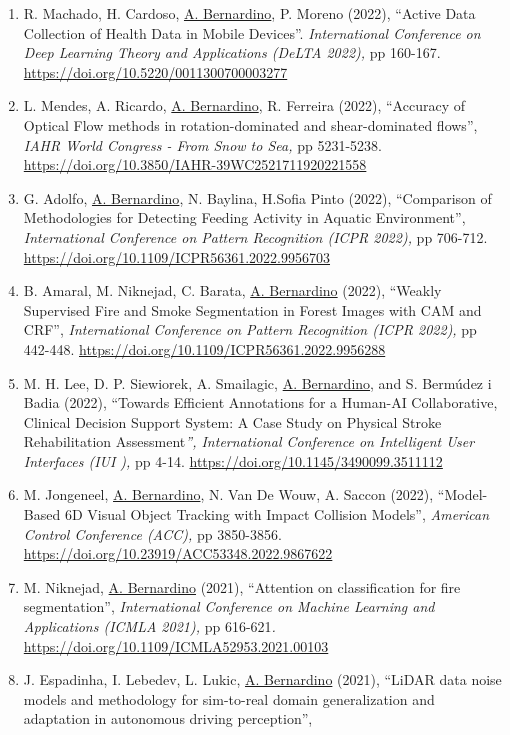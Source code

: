 \begin{enumerate}
\item
  R. Machado, H. Cardoso, \ul{A. Bernardino}, P. Moreno (2022), ``Active
  Data Collection of Health Data in Mobile Devices''.
  \emph{International Conference on Deep Learning Theory and
  Applications (DeLTA 2022),} pp 160-167.
  \url{https://doi.org/10.5220/0011300700003277}~~
\item
  L. Mendes, A. Ricardo, \ul{A. Bernardino}, R. Ferreira (2022),
  ``Accuracy of Optical Flow methods in rotation-dominated and
  shear-dominated flows'', \emph{IAHR World Congress - From Snow to
  Sea,} pp 5231-5238.
  \url{https://doi.org/10.3850/IAHR-39WC2521711920221558}~
\item
  G. Adolfo, \ul{A. Bernardino}, N. Baylina, H.Sofia Pinto (2022),
  ``Comparison of Methodologies for Detecting Feeding Activity in
  Aquatic Environment'', \emph{International Conference on Pattern
  Recognition (ICPR 2022),} pp 706-712.
  \url{https://doi.org/10.1109/ICPR56361.2022.9956703}~
\item
  B. Amaral, M. Niknejad, C. Barata, \ul{A. Bernardino} (2022), ``Weakly
  Supervised Fire and Smoke Segmentation in Forest Images with CAM and
  CRF'', \emph{International Conference on Pattern Recognition (ICPR
  2022),} pp 442-448.
  \url{https://doi.org/10.1109/ICPR56361.2022.9956288}~
\item
  M. H. Lee, D. P. Siewiorek, A. Smailagic, \ul{A. Bernardino}, and S.
  Bermúdez i Badia (2022), ``Towards Efficient Annotations for a
  Human-AI Collaborative, Clinical Decision Support System: A Case Study
  on Physical Stroke Rehabilitation Assessment\emph{'', International
  Conference on Intelligent User Interfaces (IUI ),}
  pp 4-14. \url{https://doi.org/10.1145/3490099.3511112}~
\item
  M. Jongeneel, \ul{A. Bernardino}, N. Van De Wouw, A. Saccon (2022),
  ``Model-Based 6D Visual Object Tracking with Impact Collision
  Models'', \emph{American Control Conference (ACC),} pp 3850-3856.
  \url{https://doi.org/10.23919/ACC53348.2022.9867622}~
\item
  M. Niknejad, \ul{A. Bernardino} (2021), ``Attention on classification
  for fire segmentation'', \emph{International Conference on Machine
  Learning and Applications (ICMLA 2021),} pp 616-621\emph{.}
  \url{https://doi.org/10.1109/ICMLA52953.2021.00103}~
\item
  J. Espadinha, I. Lebedev, L. Lukic, \ul{A. Bernardino} (2021), ``LiDAR
  data noise models and methodology for sim-to-real domain
  generalization and adaptation in autonomous driving perception'',

\end{enumerate}

